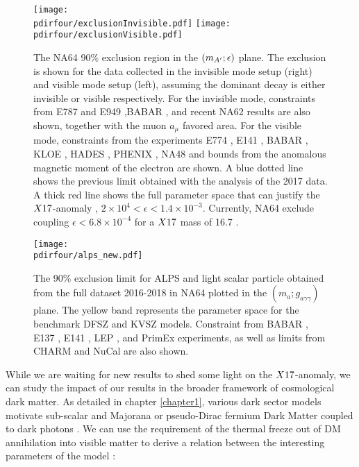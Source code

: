 \begin{figure}[tbh!]
  \centering
  \texttt{[image: \\pdirfour/exclusionInvisible.pdf]}
  \texttt{[image: \\pdirfour/exclusionVisible.pdf]}
  \caption[Exclusion limits in the $\dmplane$]{The NA64 90\% exclusion region in the $\dmplane$ plane. The exclusion is shown for the data collected in the invisible mode setup (right) and visible mode setup (left), assuming the dominant decay is either invisible or visible respectively\cite{NA64:2019imj,Banerjee:2019hmi}. For the invisible mode, constraints from E787 and E949 \cite{PhysRevD.89.095006,Essig:2013vha},BABAR \cite{PhysRevLett.119.131804}, and recent NA62 results \cite{CortinaGil:2019nuo} are also shown, together with the muon $a_{\mu}$ favored area. For the visible mode, constraints from the experiments E774 \cite{PhysRevLett.67.2942}, E141 \cite{PhysRevLett.59.755}, BABAR \cite{babar1}, KLOE \cite{kloe2}, HADES \cite{hades}, PHENIX \cite{phenix}, NA48 \cite{na48} and bounds from the anomalous magnetic moment of the electron \cite{PhysRevD.89.095006} are shown. A blue dotted line shows the previous limit obtained with the analysis of the 2017 data. A thick red line shows the full parameter space that can justify the $X17$-anomaly \cite{PhysRevD.95.035017}, $2 \times 10^{4} < \epsilon< 1.4 \times 10^{-3}$. Currently, NA64 exclude coupling $\epsilon < 6.8 \times 10^{-4}$ for a $X17$ mass of 16.7 \mev.}
  \label{fig:exclusion-dmplane}
\end{figure}

\begin{figure}[bth!]
  \centering
  \texttt{[image: \\pdirfour/alps\_new.pdf]}
  \caption[Exclusion limits in the $(m_{a};g_{a \gamma \gamma})$ plane for ALPS and light scalar]{The 90\% exclusion limit for ALPS and light scalar particle obtained from the full dataset 2016-2018 in NA64 plotted in the $(m_{a};g_{a \gamma \gamma})$ plane. The yellow band represents the parameter space for the benchmark DFSZ \cite{DINE1981199} and KVSZ \cite{PhysRevLett.43.103} models. Constraint from BABAR \cite{Dolan:2017osp}, E137 \cite{e137}, E141 \cite{blum}, LEP , and PrimEx \cite{PhysRevLett.123.071801} experiments, as well as limits from CHARM \cite{BERGSMA1985458} and NuCal \cite{Dobrich:2019dxc} are also shown.}
  \label{fig:exclusion-dmplane-alps}
\end{figure}

While we are waiting for new results to shed some light on the $X17$-anomaly, we can study the impact of our results in the broader framework of cosmological dark matter. As detailed in chapter \ref{chapter1}, various dark sector models motivate sub-\gev scalar and Majorana or pseudo-Dirac fermium Dark Matter coupled to dark photons \cite{battaglieri2017cosmic}. We can use the requirement of the thermal freeze out of DM annihilation into visible matter to derive a relation between the interesting parameters of the model \cite{na64-prd}:

